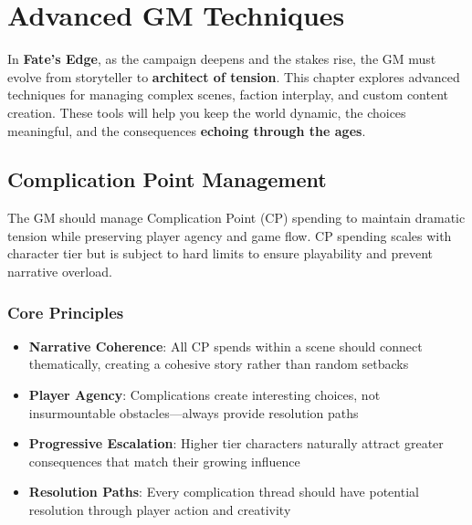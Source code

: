 \chapter{Advanced GM Techniques}

In \textbf{Fate's Edge}, as the campaign deepens and the stakes rise, the GM must evolve from storyteller to \textbf{architect of tension}. This chapter explores advanced techniques for managing complex scenes, faction interplay, and custom content creation. These tools will help you keep the world dynamic, the choices meaningful, and the consequences \textbf{echoing through the ages}.

\section*{Complication Point Management}

The GM should manage Complication Point (CP) spending to maintain dramatic tension while preserving player agency and game flow. CP spending scales with character tier but is subject to hard limits to ensure playability and prevent narrative overload.

\subsection*{Core Principles}
\begin{itemize}
    \item \textbf{Narrative Coherence}: All CP spends within a scene should connect thematically, creating a cohesive story rather than random setbacks
    \item \textbf{Player Agency}: Complications create interesting choices, not insurmountable obstacles—always provide resolution paths
    \item \textbf{Progressive Escalation}: Higher tier characters naturally attract greater consequences that match their growing influence
    \item \textbf{Resolution Paths}: Every complication thread should have potential resolution through player action and creativity
\end{itemize}

